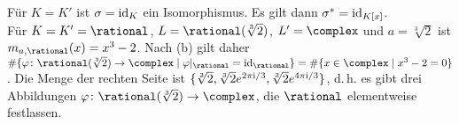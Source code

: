 \begin{Bsp}
    Für $K = K'$ ist $\sigma = \operatorname{id}_K$ ein Isomorphismus.
    Es gilt dann $\sigma^\ast = \operatorname{id}_{K[x]}$.\\
    Für $K = K' = \rational$,
    $L = \rational(\sqrt[3]{2})$, $L' = \complex$ und $a = \sqrt[3]{2}$
    ist $m_{a,\rational}(x) = x^3 - 2$.
    Nach (b) gilt daher
    $\#\{\varphi\colon \rational(\sqrt[3]{2}) \rightarrow \complex \;|\;
    \varphi|_\rational = \id_\rational\} =
    \#\{x \in \complex \;|\; x^3 - 2 = 0\}$.
    Die Menge der rechten Seite ist
    $\{\sqrt[3]{2}, \sqrt[3]{2} e^{2\pi\text{i}/3}, \sqrt[3]{2} e^{4\pi\text{i}/3}\}$,
    d.\,h. es gibt drei Abbildungen
    $\varphi\colon \rational(\sqrt[3]{2}) \rightarrow \complex$,
    die $\rational$ elementweise festlassen.
\end{Bsp}

\linie

